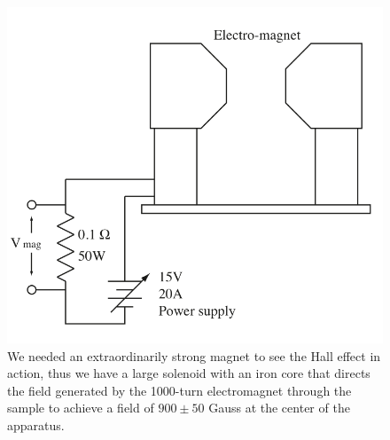 \documentclass[reprint, nobibnotes, amssymb, amsmath, amsfonts, physics, mathtools, mathrsfs, floatfix]{revtex4-1}
\begin{document}
\begin{widetext}
      \begin{figure}[h]
        \centering
        \includegraphics[width=\linewidth]{magnet_setup.png}
        \caption{We needed an extraordinarily strong magnet to see the Hall effect in action, thus we have a large solenoid with an iron core that directs the field generated by the 1000-turn electromagnet through the sample to achieve a field of $900\pm50$ Gauss at the center of the apparatus.~\label{magnet}~\cite{lab_manual}}
      \end{figure}

    \end{widetext}

  
  
\end{document}
